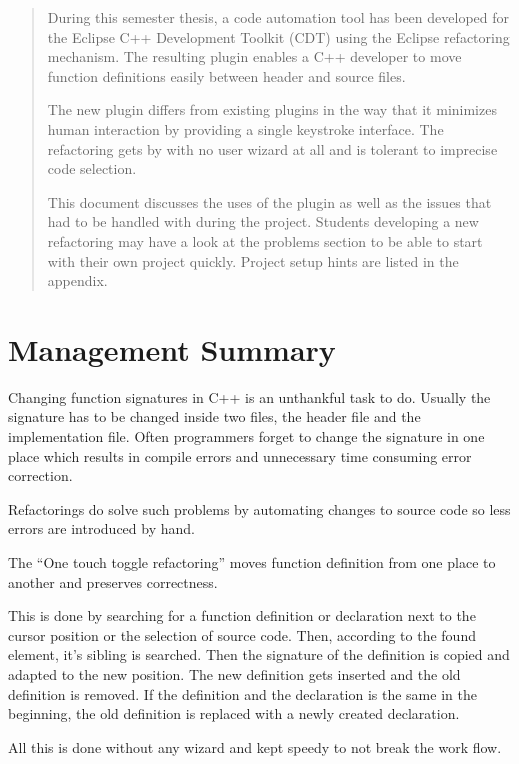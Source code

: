\begin{abstract}

During this semester thesis, a code automation tool has been developed for the 
Eclipse C++ Development Toolkit (CDT) using the Eclipse refactoring mechanism. 
The resulting plugin enables a C++ developer to move function definitions easily 
between header and source files.

The new plugin differs from existing plugins in the way that it minimizes human 
interaction by providing a single keystroke interface. The refactoring gets by 
with no user wizard at all and is tolerant to imprecise code selection. 

This document discusses the uses of the plugin as well as the issues that had 
to be handled with during the project. Students developing a new refactoring may 
have a look at the problems section to be able to start with their own project 
quickly. Project setup hints are listed in the appendix.
\end{abstract}

\chapter*{Management Summary}
Changing function signatures in C++ is an unthankful task to do. Usually the
signature has to be changed inside two files, the header file and the
implementation file. Often programmers forget to change the signature in one place
which results in compile errors and unnecessary time consuming error correction.

Refactorings do solve such problems by automating changes to source code so
less errors are introduced by hand.

The ``One touch toggle refactoring'' moves function definition from one place
to another and preserves correctness.

This is done by searching for a function definition or declaration next to the
cursor position or the selection of source code. Then, according to the found
element, it's sibling is searched. Then the signature of the definition is
copied and adapted to the new position. The new definition gets inserted and
the old definition is removed.
If the definition and the declaration is the same in the beginning, the old
definition is replaced with a newly created declaration.

All this is done without any wizard and kept speedy to not break the work flow.
\thispagestyle{empty}
\pagebreak

